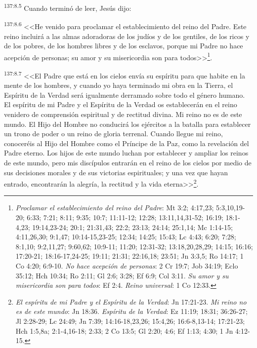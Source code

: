 \par 
\textsuperscript{137:8.5} Cuando terminó de leer, Jesús dijo:

\par 
\textsuperscript{137:8.6} <<He venido para proclamar el establecimiento del reino del Padre. Este reino incluirá a las almas adoradoras de los judíos y de los gentiles, de los ricos y de los pobres, de los hombres libres y de los esclavos, porque mi Padre no hace acepción de personas; su amor y su misericordia son para todos>>\footnote{\textit{Proclamar el establecimiento del reino del Padre}: Mt 3:2; 4:17,23; 5:3,10,19-20; 6:33; 7:21; 8:11; 9:35; 10:7; 11:11-12; 12:28; 13:11,14,31-52; 16:19; 18:1-4,23; 19:14,23-24; 20:1; 21:31,43; 22:2; 23:13; 24:14; 25:1,14; Mc 1:14-15; 4:11,26,30; 9:1,47; 10:14-15,23-25; 12:34; 14:25; 15:43; Lc 4:43; 6:20; 7:28; 8:1,10; 9:2,11,27; 9:60,62; 10:9-11; 11:20; 12:31-32; 13:18,20,28,29; 14:15; 16:16; 17:20-21; 18:16-17,24-25; 19:11; 21:31; 22:16,18; 23:51; Jn 3:3,5; Ro 14:17; 1 Co 4:20; 6:9-10. \textit{No hace acepción de personas}: 2 Cr 19:7; Job 34:19; Eclo 35:12; Hch 10:34; Ro 2:11; Gl 2:6; 3:28; Ef 6:9; Col 3:11. \textit{Su amor y su misericordia son para todos}: Ef 2:4. \textit{Reino universal}: 1 Co 12:33.}.

\par 
\textsuperscript{137:8.7} <<El Padre que está en los cielos envía su espíritu para que habite en la mente de los hombres, y cuando yo haya terminado mi obra en la Tierra, el Espíritu de la Verdad será igualmente derramado sobre todo el género humano. El espíritu de mi Padre y el Espíritu de la Verdad os establecerán en el reino venidero de comprensión espiritual y de rectitud divina. Mi reino no es de este mundo. El Hijo del Hombre no conducirá los ejércitos a la batalla para establecer un trono de poder o un reino de gloria terrenal. Cuando llegue mi reino, conoceréis al Hijo del Hombre como el Príncipe de la Paz, como la revelación del Padre eterno. Los hijos de este mundo luchan por establecer y ampliar los reinos de este mundo, pero mis discípulos entrarán en el reino de los cielos por medio de sus decisiones morales y de sus victorias espirituales; y una vez que hayan entrado, encontrarán la alegría, la rectitud y la vida eterna>>\footnote{\textit{El espíritu de mi Padre y el Espíritu de la Verdad}: Jn 17:21-23. \textit{Mi reino no es de este mundo}: Jn 18:36. \textit{Espíritu de la Verdad}: Ez 11:19; 18:31; 36:26-27; Jl 2:28-29; Lc 24:49; Jn 7:39; 14:16-18,23,26; 15:4,26; 16:6-8,13-14; 17:21-23; Hch 1:5,8a; 2:1-4,16-18; 2:33; 2 Co 13:5; Gl 2:20; 4:6; Ef 1:13; 4:30; 1 Jn 4:12-15.}.

